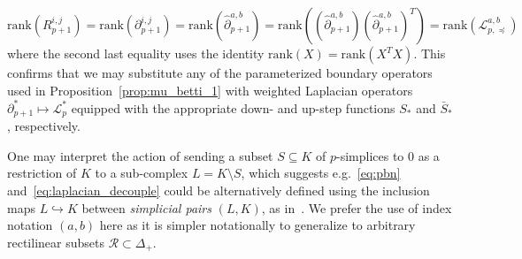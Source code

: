 \begin{equation}
	\mathrm{rank}(R_{p+1}^{i,j}) = \mathrm{rank}(\partial_{p+1}^{i, j}) = \mathrm{rank}(\hat{\partial}_{p+1}^{a,b}) = \mathrm{rank}\left((\hat{\partial}_{p+1}^{a,b})(\hat{\partial}_{p+1}^{a,b})^T \right) = \mathrm{rank}(\mathcal{L}_{p, \preceq}^{a,b})
\end{equation}
where the second last equality uses the identity $\mathrm{rank}(X) = \mathrm{rank}(X^T X)$. This confirms that we may substitute any of the parameterized boundary operators used in Proposition~\ref{prop:mu_betti_1}  with weighted Laplacian operators $\partial_{p+1}^\ast \mapsto \mathcal{L}_p^\ast$ equipped with the appropriate down- and up-step functions $S_\ast$ and $\bar{S}_\ast$, respectively.   


\begin{remark}
One may interpret the action of sending a subset $S \subseteq K$ of $p$-simplices to $0$ as a restriction of $K$ to a sub-complex $L = K \setminus S$, which suggests e.g.~\eqref{eq:pbn} and~\eqref{eq:laplacian_decouple} could be alternatively defined using the inclusion maps $L \hookrightarrow K$ between \emph{simplicial pairs} $(L, K)$, as in~\cite{memoli2022persistent}. 
We prefer the use of index notation $(a,b)$ here as it is simpler notationally to generalize to arbitrary rectilinear subsets $\mathcal{R} \subset \Delta_+$.
\end{remark}

